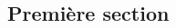 \documentclass[10pt, french]{article}
\begin{document}
\small %
\begin{multicols*}{3} %
\section{Première section}





\end{multicols*}
\end{document}
